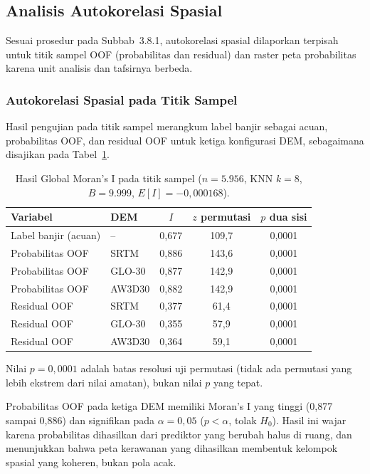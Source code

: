 \documentclass[12pt]{article}
\begin{document}
\subsection{Analisis Autokorelasi Spasial}

Sesuai prosedur pada Subbab~3.8.1, autokorelasi spasial dilaporkan terpisah
untuk titik sampel OOF (probabilitas dan residual) dan raster peta
probabilitas karena unit analisis dan tafsirnya berbeda.

\subsubsection{Autokorelasi Spasial pada Titik Sampel}

Hasil pengujian pada titik sampel merangkum label banjir sebagai acuan,
probabilitas OOF, dan residual OOF untuk ketiga konfigurasi DEM, sebagaimana
disajikan pada Tabel~\ref{tab:moran-oof}.

\begin{table}[ht]
\centering
\caption{Hasil Global Moran's I pada titik sampel ($n=5.956$, KNN $k=8$,
$B=9.999$, $E[I]=-0{,}000168$).}
\label{tab:moran-oof}
\begin{tabular}{llccc}
\toprule
\textbf{Variabel} & \textbf{DEM} & \textbf{$I$} & \textbf{$z$ permutasi} & \textbf{$p$ dua sisi} \\
\midrule
Label banjir (acuan) & --     & 0,677 & 109,7 & 0,0001 \\
Probabilitas OOF     & SRTM   & 0,886 & 143,6 & 0,0001 \\
Probabilitas OOF     & GLO-30 & 0,877 & 142,9 & 0,0001 \\
Probabilitas OOF     & AW3D30 & 0,882 & 142,9 & 0,0001 \\
Residual OOF         & SRTM   & 0,377 & 61,4  & 0,0001 \\
Residual OOF         & GLO-30 & 0,355 & 57,9  & 0,0001 \\
Residual OOF         & AW3D30 & 0,364 & 59,1  & 0,0001 \\
\bottomrule
\end{tabular}
\end{table}

Nilai $p=0{,}0001$ adalah batas resolusi uji permutasi (tidak ada permutasi
yang lebih ekstrem dari nilai amatan), bukan nilai $p$ yang tepat.

Probabilitas OOF pada ketiga DEM memiliki Moran's I yang tinggi (0,877 sampai
0,886) dan signifikan pada $\alpha=0{,}05$ ($p<\alpha$, tolak $H_0$). Hasil
ini wajar karena probabilitas dihasilkan dari prediktor yang berubah halus di
ruang, dan menunjukkan bahwa peta kerawanan yang dihasilkan membentuk
kelompok spasial yang koheren, bukan pola acak.
\end{document}
